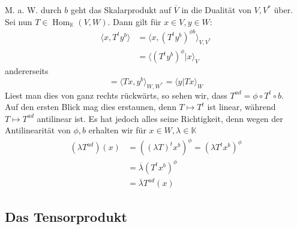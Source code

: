 \documentclass[12pt,a4paper]{article}
\theoremstyle{definition}
\theoremstyle{remark}
\renewcommand{\bar}[1]{\overline{#1}}
\DeclareMathOperator{\Hom}{Hom}
\begin{document}
	M. a. W. durch $b$ geht das Skalarprodukt auf $\bar{V}$ in die Dualität von $V, V^*$ über. \\
	Sei nun $T \in \Hom_{\mathbb{K}}(V,W)$. Dann gilt für $x \in V, y \in W$: 
	\begin{equation}
		\begin{split}
			\langle x, T^t y^b \rangle &= \langle x, (T^t y^b)^{\phi b} \rangle_{V,V^*} \\
			&= \langle (T^t y^b)^{\phi} | x \rangle_V
		\end{split}
	\end{equation}
	andererseits
	\begin{equation}
		= \langle Tx, y^b \rangle_{W, W^*} = \langle y | Tx \rangle_W
	\end{equation}
	Liest man dies von ganz rechts rückwärts, so sehen wir, dass $T^{ad} = \phi \circ T^t \circ b$. \\
	Auf den ersten Blick mag dies erstaunen, denn $T \mapsto T^t$ ist linear, während $T \mapsto T^{ad}$ antilinear ist. Es hat jedoch alles seine Richtigkeit, denn wegen der Antilinearität von $\phi, b$ erhalten wir für $x \in W, \lambda \in \mathbb{K}$
	\begin{equation}
		\begin{split}
			(\lambda T^{ad})(x) &= \left( (\lambda T )^t x^b \right)^{\phi} = (\lambda T^t x^b)^{\phi} \\
			&= \bar{\lambda}(T^t x^b)^{\phi} \\
			&= \bar{\lambda} T^{ad}(x)
		\end{split}
	\end{equation}
	\subsection{Das Tensorprodukt}
	
\end{document}
